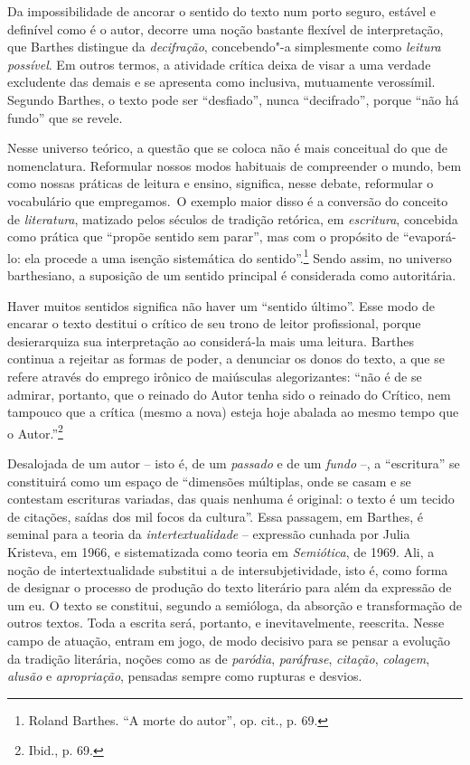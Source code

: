 Da impossibilidade de ancorar o sentido do texto num porto seguro,
estável e definível como é o autor, decorre uma noção bastante flexível
de interpretação, que Barthes distingue da \emph{decifração}, concebendo"-a
simplesmente como \emph{leitura possível}. Em outros termos, a atividade
crítica deixa de visar a uma verdade excludente das demais e se
apresenta como inclusiva, mutuamente verossímil. Segundo Barthes, o
texto pode ser ``desfiado'', nunca ``decifrado'', porque ``não há
fundo'' que se revele.

Nesse universo teórico, a questão que se coloca não é mais conceitual do
que de nomenclatura. Reformular nossos modos habituais de compreender o
mundo, bem como nossas práticas de leitura e ensino, significa, nesse
debate, reformular o vocabulário que empregamos.~O exemplo maior disso é
a conversão do conceito de \emph{literatura}, matizado pelos séculos de
tradição retórica, em \emph{escritura}, concebida como prática que ``propõe
sentido sem parar'', mas com o propósito de ``evaporá-lo: ela procede a
uma isenção sistemática do sentido''.\footnote{Roland Barthes. ``A morte
  do autor'', op. cit., p. 69.} Sendo assim, no universo barthesiano, a
suposição de um sentido principal é considerada como autoritária.

Haver muitos sentidos significa não haver um ``sentido último''. Esse
modo de encarar o texto destitui o crítico de seu trono de leitor
profissional, porque desierarquiza sua interpretação ao considerá-la
mais uma leitura. Barthes continua a rejeitar as formas de poder, a
denunciar os donos do texto, a que se refere através do emprego irônico
de maiúsculas alegorizantes: ``não é de se admirar, portanto, que o
reinado do Autor tenha sido o reinado do Crítico, nem tampouco que a
crítica (mesmo a nova) esteja hoje abalada ao mesmo tempo que o
Autor.''\footnote{Ibid., p. 69.}

Desalojada de um autor -- isto é, de um \emph{passado} e de um \emph{fundo} --, a
``escritura'' se constituirá como um espaço de ``dimensões múltiplas,
onde se casam e se contestam escrituras variadas, das quais nenhuma é
original: o texto é um tecido de citações, saídas dos mil focos da
cultura''. Essa passagem, em Barthes, é seminal para a teoria da
\emph{intertextualidade} -- expressão cunhada por Julia Kristeva, em 1966, e
sistematizada como teoria em \emph{Semiótica}, de 1969. Ali, a noção de
intertextualidade substitui a de intersubjetividade, isto é, como forma
de designar o processo de produção do texto literário para além da
expressão de um eu. O texto se constitui, segundo a semióloga, da
absorção e transformação de outros textos. Toda a escrita será,
portanto, e inevitavelmente, reescrita. Nesse campo de atuação, entram
em jogo, de modo decisivo para se pensar a evolução da tradição
literária, noções como as de \emph{paródia}, \emph{paráfrase}, \emph{citação}, \emph{colagem},
\emph{alusão} e \emph{apropriação}, pensadas sempre como rupturas e desvios.

